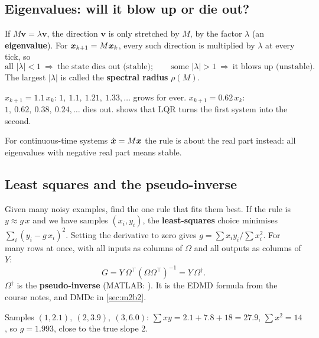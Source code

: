 \subsection{Eigenvalues: will it blow up or die out?}
\label{sec:eig}

If $M\bm v=\lambda\bm v$, the direction $\bm v$ is only stretched by $M$, by the factor $\lambda$ (an
\textbf{eigenvalue}). For $\bm{x}_{k+1}=M\bm{x}_k$, every such direction is multiplied by $\lambda$ at every tick, so
\[
\text{all }|\lambda|<1\ \Rightarrow\ \text{the state dies out (stable)};\qquad
\text{some }|\lambda|>1\ \Rightarrow\ \text{it blows up (unstable)}.
\]
The largest $|\lambda|$ is called the \textbf{spectral radius} $\rho(M)$.
\begin{toy}
$x_{k+1}=1.1\,x_k$: $1,\ 1.1,\ 1.21,\ 1.33,\dots$ grows for ever.\quad
$x_{k+1}=0.62\,x_k$: $1,\ 0.62,\ 0.38,\ 0.24,\dots$ dies out.  shows that LQR turns the first system into the second.
\end{toy}
For continuous-time systems $\dot{\bm{x}}=M\bm{x}$ the rule is about the real part instead: all eigenvalues with negative
real part means stable.

\subsection{Least squares and the pseudo-inverse}
\label{sec:lsq}

Given many noisy examples, find the one rule that fits them best. If the rule is $y\approx g\,x$ and we have samples
$(x_i,y_i)$, the \textbf{least-squares} choice minimises $\sum_i(y_i-g\,x_i)^2$. Setting the derivative to zero gives
$g=\sum x_iy_i/\sum x_i^2$. For many rows at once, with all inputs as columns of $\Omega$ and all outputs as
columns of $Y$:
\[
G=Y\,\Omega^\top(\Omega\Omega^\top)^{-1}=Y\,\Omega^\dagger .
\]
$\Omega^\dagger$ is the \textbf{pseudo-inverse} (MATLAB: ). It is the EDMD formula
 from the course notes, and DMDc in \cref{sec:m2b2}.
\begin{toy}
Samples $(1,2.1),\ (2,3.9),\ (3,6.0)$: $\sum xy=2.1+7.8+18=27.9$, $\sum x^2=14$, so $g=1.993$, close to the
true slope 2.
\end{toy}
